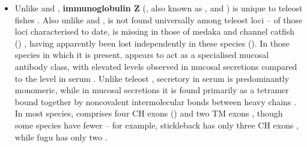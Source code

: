 \begin{itemize}
\item Unlike  and , \textbf{immunoglobulin Z} (, also known as ,  and ) is unique to teleost fishes \parencite{fillatreau2013astonishing}. Also unlike  and ,  is not found universally among teleost loci -- of those \igh{} loci characterised to date,  is missing in those of medaka and channel catfish ()  \parencite{fillatreau2013astonishing,magadan2011medaka}, having apparently been lost independently in these species (). In those species in which it is present,  appears to act as a specialised mucosal antibody class, with elevated levels observed in mucosal secretions compared to the level in serum \parencite{zhang2010igtgut,fillatreau2013astonishing,xu2013igtskin}. Unlike teleost , secretory  in serum is predominantly monomeric, while in mucosal secretions it is found primarily as a tetramer bound together by noncovalent intermolecular bonds between heavy chains \parencite{zhang2010igtgut}. In most species,  comprises four CH exons () and two TM exons \parencite{mashoof2016immunoglobulins}, though some species have fewer -- for example, stickleback  has only three CH exons \parencite{bao2010stickleback,gambondeza2011stickleback}, while fugu  has only two \parencite{fillatreau2013astonishing,savan2005fugu}.
\end{itemize}

